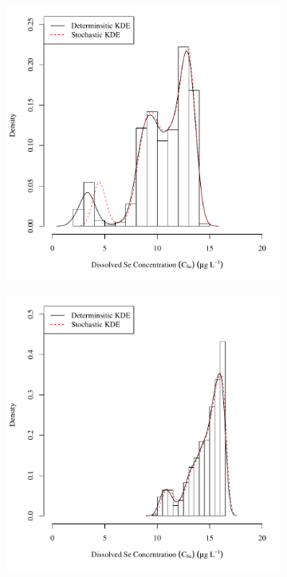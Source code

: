 \begin{linenumbers}
\subfiguretop
\begin{landscape}
	\begin{figure}
		\begin{subfigure}{0.7\textwidth}
			\centering
			\includegraphics[width=\tableCustomSize]{"Figures/Results_DSR/Stochastic/c d&s est D101C"}
		\end{subfigure}%
		\begin{subfigure}{0.7\textwidth}
			\centering
			\includegraphics[width=\tableCustomSize]{"Figures/Results_DSR/Stochastic/c d&s est D106C"}

\end{subfigure}
\end{figure}
\end{landscape}
\end{linenumbers}
